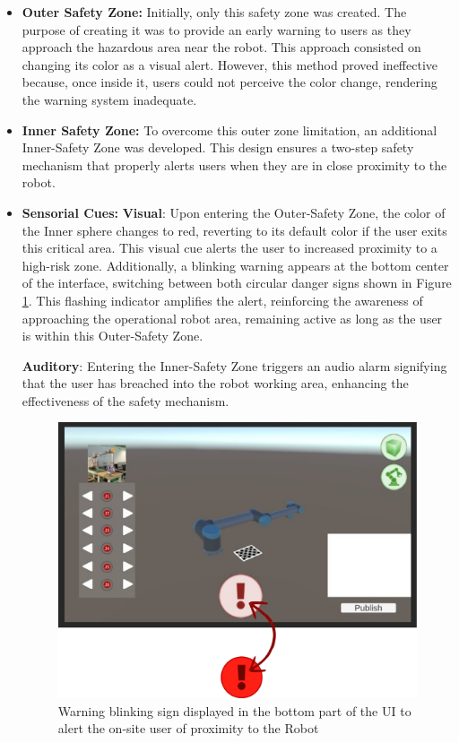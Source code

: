\begin{itemize}
\item \textbf{Outer Safety Zone:} Initially, only this safety zone was created. The purpose of creating it was to provide an 
early warning to users as they approach the hazardous area near the robot. This approach consisted on changing its color as a visual alert. 
However, this method proved ineffective because, once inside it, users could not perceive the color change, rendering the warning system inadequate.

\item \textbf{Inner Safety Zone:} To overcome this outer zone limitation, an additional Inner-Safety Zone was developed. This design ensures a two-step safety mechanism that properly alerts users when they are in close proximity to the robot.

\item \textbf{Sensorial Cues:  }
\textbf{Visual}: Upon entering the Outer-Safety Zone, the color of the Inner sphere changes to red, reverting to its default color if the user exits this critical area. This visual cue alerts the user to increased proximity to a high-risk zone. Additionally, a blinking warning appears at the bottom center of the interface, switching between both circular danger signs shown in Figure \ref{fig:blinking-sign}. This flashing indicator amplifies the alert, reinforcing the awareness of approaching the operational robot area, remaining active as long as the user is within this Outer-Safety Zone.


\textbf{Auditory}: Entering the Inner-Safety Zone triggers an audio alarm signifying that the user has breached into the robot working area, enhancing the effectiveness of the safety mechanism.

\begin{figure}[h]
    \centering
    \includegraphics[width=0.7\linewidth]{figs/sign-alert.png}
    \caption{Warning blinking sign displayed in the bottom part of the \ac{UI} to alert the on-site user of proximity to the Robot}
    \label{fig:blinking-sign}
\end{figure}


\end{itemize}
